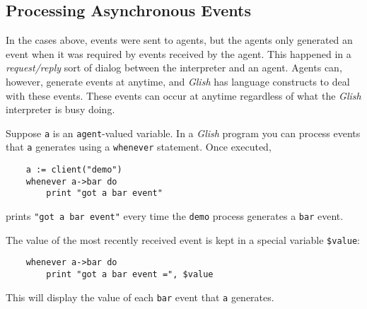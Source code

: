 \subsection{Processing Asynchronous Events}


 In the cases above, events were sent to agents, but the agents only generated
an event when it was required by events received by the agent. This
happened in a {\em request/reply} sort of dialog between the interpreter
and an agent. Agents can, however, generate events at anytime, and
{\em Glish}
has language constructs to deal with these events. These events can
occur at anytime regardless of what the {\em Glish} interpreter 
is busy doing.

Suppose {\tt a} is an {\tt agent}-valued variable.  In
a {\em Glish} program you can process events that {\tt a} generates
using a {\tt whenever} statement.  Once executed,
\begin{verbatim}
    a := client("demo")
    whenever a->bar do
        print "got a bar event"
\end{verbatim}
prints {\tt "got a bar event"} every time the {\tt demo}
process generates a {\tt bar} event.

The value of the most recently received event is kept in a
special variable {\tt \$value}:
\begin{verbatim}
    whenever a->bar do
        print "got a bar event =", $value
\end{verbatim}
This will display the value of each {\tt bar} 
event that {\tt a} generates.

